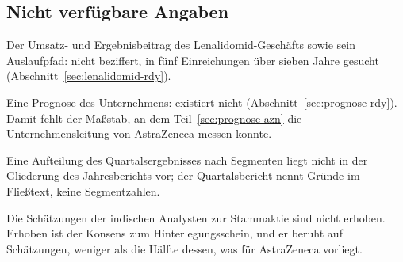 
\subsection{Nicht verf\"ugbare Angaben}

Der Umsatz- und Ergebnisbeitrag des Lenalidomid-Gesch\"afts sowie sein
Auslaufpfad: nicht beziffert, in f\"unf Einreichungen \"uber sieben Jahre
gesucht (Abschnitt~\ref{sec:lenalidomid-rdy}).

Eine Prognose des Unternehmens: existiert nicht
(Abschnitt~\ref{sec:prognose-rdy}). Damit fehlt der Ma{\ss}stab, an dem
Teil~\ref{sec:prognose-azn} die Unternehmensleitung von AstraZeneca messen
konnte.

Eine Aufteilung des Quartalsergebnisses nach Segmenten liegt nicht in der
Gliederung des Jahresberichts vor; der Quartalsbericht nennt Gr\"unde im
Flie{\ss}text, keine Segmentzahlen.

Die Sch\"atzungen der indischen Analysten zur Stammaktie sind nicht erhoben.
Erhoben ist der Konsens zum Hinterlegungsschein, und er beruht auf
\Stueck{\RdyKonsensHaeuser} Sch\"atzungen, weniger als die H\"alfte dessen,
was f\"ur AstraZeneca vorliegt.
